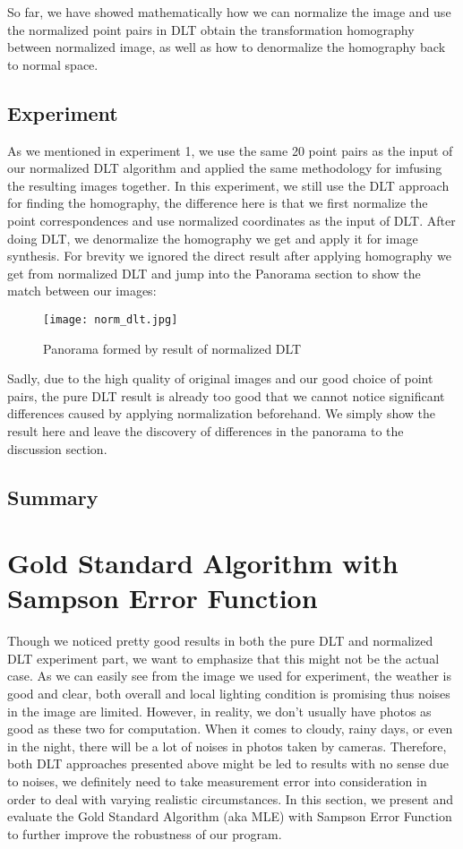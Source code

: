 \documentclass[conference]{IEEEtran}
\begin{document}
So far, we have showed mathematically how we can normalize the image and use the normalized point pairs in DLT obtain the transformation homography between normalized image, as well as how to denormalize the homography back to normal space.

\subsection{Experiment}
As we mentioned in experiment 1, we use the same 20 point pairs as the input of our normalized DLT algorithm and applied the same methodology for imfusing the resulting images together. In this experiment, we still use the DLT approach for finding the homography, the difference here is that we first normalize the point correspondences and use normalized coordinates as the input of DLT. After doing DLT, we denormalize the homography we get and apply it for image synthesis. For brevity we ignored the direct result after applying homography we get from normalized DLT and jump into the Panorama section to show the match between our images:
\begin{figure}[htbp]
\begin{center}
\texttt{[image: norm\_dlt.jpg]} 
\end{center}	   
\caption{Panorama formed by result of normalized DLT}\label{norm_dlt}
\end{figure}

Sadly, due to the high quality of original images and our good choice of point pairs, the pure DLT result is already too good that we cannot notice significant differences caused by applying normalization beforehand. We simply show the result here and leave the discovery of differences in the panorama to the discussion section.

\subsection{Summary}

\section{Gold Standard Algorithm with Sampson Error Function}
Though we noticed pretty good results in both the pure DLT and normalized DLT experiment part, we want to emphasize that this might not be the actual case. As we can easily see from the image we used for experiment, the weather is good and clear, both overall and local lighting condition is promising thus noises in the image are limited. However, in reality, we don't usually have photos as good as these two for computation. When it comes to cloudy, rainy days, or even in the night, there will be a lot of noises in photos taken by cameras. Therefore, both DLT approaches presented above might be led to results with no sense due to noises, we definitely need to take measurement error into consideration in order to deal with varying realistic circumstances. In this section, we present and evaluate the Gold Standard Algorithm (aka MLE) with Sampson Error Function to further improve the robustness of our program.
\end{document}
